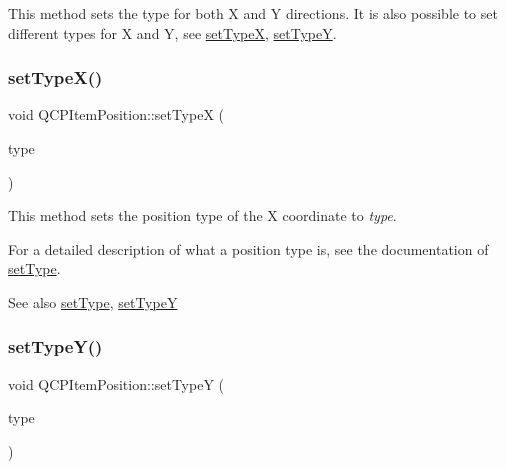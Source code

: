 This method sets the type for both X and Y directions. It is also possible to set different types for X and Y, see \mbox{\hyperlink{class_q_c_p_item_position_a2113b2351d6d00457fb3559a4e20c3ea}{set\+TypeX}}, \mbox{\hyperlink{class_q_c_p_item_position_ac2a454aa5a54c1615c50686601ec4510}{set\+TypeY}}. \mbox{\label{class_q_c_p_item_position_a2113b2351d6d00457fb3559a4e20c3ea}} 
\subsubsection{\texorpdfstring{set\+Type\+X()}{setTypeX()}}
{\footnotesize\ttfamily void Q\+C\+P\+Item\+Position\+::set\+TypeX (\begin{DoxyParamCaption}\item[{\mbox{\hyperlink{class_q_c_p_item_position_aad9936c22bf43e3d358552f6e86dbdc8}{Q\+C\+P\+Item\+Position\+::\+Position\+Type}}}]{type }\end{DoxyParamCaption})}

This method sets the position type of the X coordinate to {\itshape type}.

For a detailed description of what a position type is, see the documentation of \mbox{\hyperlink{class_q_c_p_item_position_aa476abf71ed8fa4c537457ebb1a754ad}{set\+Type}}.

\begin{DoxySeeAlso}{See also}
\mbox{\hyperlink{class_q_c_p_item_position_aa476abf71ed8fa4c537457ebb1a754ad}{set\+Type}}, \mbox{\hyperlink{class_q_c_p_item_position_ac2a454aa5a54c1615c50686601ec4510}{set\+TypeY}} 
\end{DoxySeeAlso}
\mbox{\label{class_q_c_p_item_position_ac2a454aa5a54c1615c50686601ec4510}} 
\subsubsection{\texorpdfstring{set\+Type\+Y()}{setTypeY()}}
{\footnotesize\ttfamily void Q\+C\+P\+Item\+Position\+::set\+TypeY (\begin{DoxyParamCaption}\item[{\mbox{\hyperlink{class_q_c_p_item_position_aad9936c22bf43e3d358552f6e86dbdc8}{Q\+C\+P\+Item\+Position\+::\+Position\+Type}}}]{type }\end{DoxyParamCaption})}


